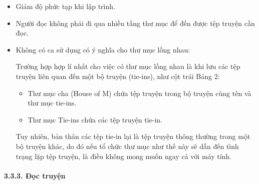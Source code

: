 \documentclass[
]{article}
\providecommand{\tightlist}{%
  \setlength{\itemsep}{0pt}\setlength{\parskip}{0pt}}
\begin{document}
\begin{itemize}
\item
  Giảm độ phức tạp khi lập trình.
\item
  Người đọc không phải đi qua nhiều tầng thư mục để đến được tệp truyện
  cần đọc.
\item
  Không có ca sử dụng có ý nghĩa cho thư mục lồng nhau:

  Trường hợp hợp lí nhất cho việc có thư mục lồng nhau là khi lưu các
  tệp truyện liên quan đến một bộ truyện (tie-ins), như cột trái Bảng 2:

  \begin{itemize}
  \tightlist
  \item
    Thư mục cha (House of M) chứa tệp truyện trong bộ truyện cùng tên và
    thư mục tie-ins.
  \item
    Thư mục Tie-ins chứa các tệp truyện tie-in.
  \end{itemize}

  Tuy nhiên, bản thân các tệp tie-in lại là tệp truyện thông thường
  trong một bộ truyện khác, do đó nếu tổ chức thư mục như thế này sẽ dẫn
  đến tình trạng lặp tệp truyện, là điều không mong muốn ngay cả với máy
  tính.
\end{itemize}

\hypertarget{ux111ux1ecdc-truyux1ec7n}{%
\paragraph{\texorpdfstring{3.3.3. Đọc truyện
}{3.3.3. Đọc truyện }}\label{ux111ux1ecdc-truyux1ec7n}}
\end{document}
